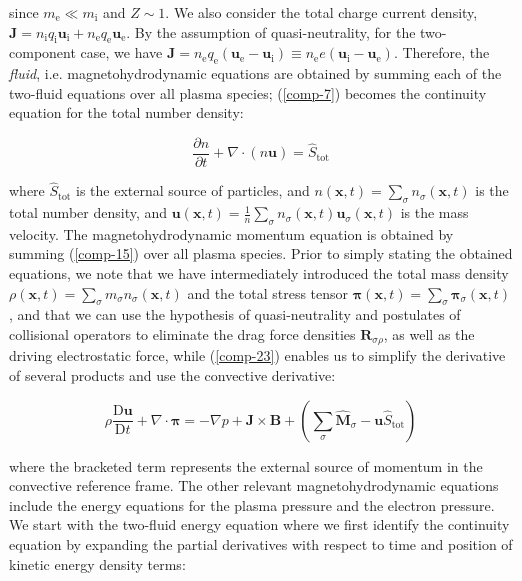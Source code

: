 since $m_{\mathrm{e}}\ll m_{\mathrm{i}}$ and $Z\sim1$. We also consider the total charge current density, $\mathbf{J}=n_{\mathrm{i}}q_{\mathrm{i}}\mathbf{u}_{\mathrm{i}}+n_{\mathrm{e}}q_{\mathrm{e}}\mathbf{u}_{\mathrm{e}}$. By the assumption of quasi-neutrality, for the two-component case, we have $\mathbf{J}=n_{\mathrm{e}}q_{\mathrm{e}}\left(\mathbf{u}_{\mathrm{e}}-\mathbf{u}_{\mathrm{i}}\right)\equiv n_{\mathrm{e}}e \left(\mathbf{u}_{\mathrm{i}}-\mathbf{u}_{\mathrm{e}}\right)$. Therefore, the \textit{fluid}, i.e. magnetohydrodynamic equations are obtained by summing each of the two-fluid equations over all plasma species; (\ref{comp-7}) becomes the continuity equation for the total number density:

\begin{equation}
    \label{comp-23}
    \frac{\partial n}{\partial t}+\nabla\cdot \left(n \mathbf{u}\right)=\hat{S}_{\mathrm{tot}}
\end{equation}

where $\hat{S}_{\mathrm{tot}}$ is the external source of particles, and $n(\mathbf{x},t)=\sum_{\sigma} n_\sigma(\mathbf{x},t)$ is the total number density, and $\mathbf{u}(\mathbf{x},t)=\frac{1}{n}\sum_{\sigma}n_\sigma(\mathbf{x},t)\mathbf{u}_\sigma(\mathbf{x},t)$ is the mass velocity. The magnetohydrodynamic momentum equation is obtained by summing (\ref{comp-15}) over all plasma species. Prior to simply stating the obtained equations, we note that we have intermediately introduced the total mass density $\rho(\mathbf{x},t)=\sum_{\sigma}m_\sigma n_\sigma(\mathbf{x},t)$ and the total stress tensor $\boldsymbol{\pi}(\mathbf{x},t)=\sum_{\sigma}\boldsymbol{\pi}_\sigma(\mathbf{x},t)$, and that we can use the hypothesis of quasi-neutrality and postulates of collisional operators to eliminate the drag force densities $\mathbf{R}_{\sigma \rho}$, as well as the driving electrostatic force, while (\ref{comp-23}) enables us to simplify the derivative of several products and use the convective derivative:

\begin{equation}
    \label{comp-24}
    \rho \frac{\mathrm{D}\mathbf{u}}{\mathrm{D}t}+\nabla\cdot\boldsymbol{\pi}=-\nabla p + \mathbf{J}\times \mathbf{B} + \left(\sum_{\sigma} \mathbf{\hat{M}}_\sigma - \mathbf{u}\hat{S}_{\mathrm{tot}}\right)
\end{equation}

where the bracketed term represents the external source of momentum in the convective reference frame. The other relevant magnetohydrodynamic equations include the energy equations for the plasma pressure and the electron pressure. We start with the two-fluid energy equation where we first identify the continuity equation by expanding the partial derivatives with respect to time and position of kinetic energy density terms:


